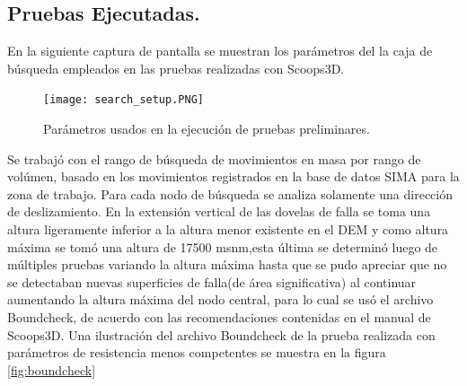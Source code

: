\subsection{Pruebas Ejecutadas.}
En la siguiente captura de pantalla se muestran los par\'{a}metros del la caja de b\'{u}squeda
empleados en las pruebas realizadas con Scoops3D.\\

\begin{figure}[H]
\centering
	\texttt{[image: search\_setup.PNG]} 
	\caption{Par\'ametros usados en la ejecuci\'on de pruebas preliminares.}
	\label{fig:test}
\end{figure}


Se trabaj\'{o} con el rango de b\'{u}squeda de movimientos en masa por rango de vol\'umen,
basado en los movimientos registrados en la base de datos SIMA para la zona de trabajo.
Para cada nodo de b\'{u}squeda se analiza solamente una direcci\'{o}n de deslizamiento.
En la extensi\'{o}n vertical de las dovelas de falla se toma una altura ligeramente inferior a la
altura menor existente en el DEM y como altura m\'{a}xima se tom\'{o} una altura de 17500
msnm,esta \'{u}ltima se determin\'{o} luego de m\'{u}ltiples pruebas variando la altura m\'{a}xima hasta
que se pudo apreciar que no se detectaban nuevas superficies de falla(de \'area significativa) al continuar
aumentando la altura m\'{a}xima del nodo central, para lo cual se us\'{o} el archivo Boundcheck, de acuerdo con las recomendaciones contenidas en el manual de Scoops3D. Una ilustraci\'on del archivo Boundcheck de la prueba realizada con par\'ametros de resistencia menos competentes se muestra en la figura \ref{fig:boundcheck} 

